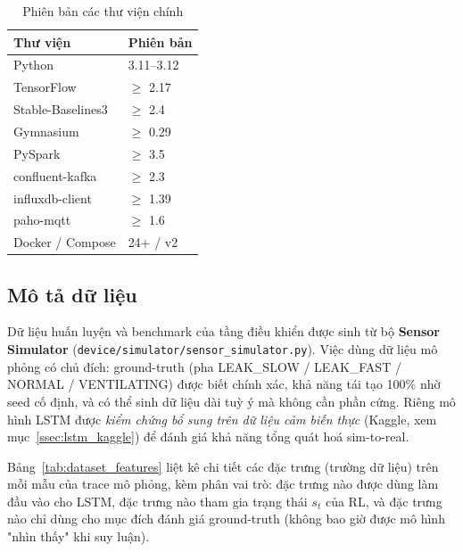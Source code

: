\begin{table}[H]
\centering
\caption{Phiên bản các thư viện chính}
\label{tab:env_software}
\begin{tabular}{ll}
\toprule
\textbf{Thư viện} & \textbf{Phiên bản} \\
\midrule
Python              & 3.11--3.12 \\
TensorFlow          & $\geq$ 2.17 \\
Stable-Baselines3   & $\geq$ 2.4 \\
Gymnasium           & $\geq$ 0.29 \\
PySpark             & $\geq$ 3.5 \\
confluent-kafka     & $\geq$ 2.3 \\
influxdb-client     & $\geq$ 1.39 \\
paho-mqtt           & $\geq$ 1.6 \\
Docker / Compose    & 24+ / v2 \\
\bottomrule
\end{tabular}
\end{table}

\subsection{Mô tả dữ liệu}
\label{ssec:dataset}

Dữ liệu huấn luyện và benchmark của tầng điều khiển được sinh từ bộ \textbf{Sensor Simulator} (\texttt{device/simulator/sensor\_simulator.py}). Việc dùng dữ liệu mô phỏng có chủ đích: ground-truth (pha LEAK\_SLOW / LEAK\_FAST / NORMAL / VENTILATING) được biết chính xác, khả năng tái tạo 100\% nhờ seed cố định, và có thể sinh dữ liệu dài tuỳ ý mà không cần phần cứng. Riêng mô hình LSTM được \emph{kiểm chứng bổ sung trên dữ liệu cảm biến thực} (Kaggle, xem mục~\ref{ssec:lstm_kaggle}) để đánh giá khả năng tổng quát hoá sim-to-real.

Bảng~\ref{tab:dataset_features} liệt kê chi tiết các đặc trưng (trường dữ liệu) trên mỗi mẫu của trace mô phỏng, kèm phân vai trò: đặc trưng nào được dùng làm đầu vào cho LSTM, đặc trưng nào tham gia trạng thái $s_t$ của RL, và đặc trưng nào chỉ dùng cho mục đích đánh giá ground-truth (không bao giờ được mô hình "nhìn thấy" khi suy luận).

